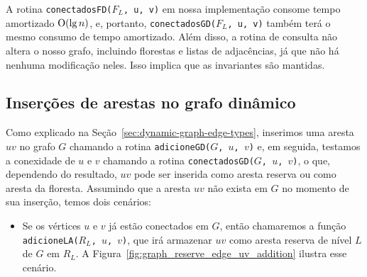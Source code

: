 \raggedbottom


A rotina \texttt{conectadosFD($F_L$, u, v)} em nossa implementação consome tempo amortizado $\mathrm{O}(\lg n)$, e, portanto, \texttt{conectadosGD($F_L$, u, v)} também terá o mesmo consumo de tempo amortizado.
Além disso, a rotina de consulta não altera o nosso grafo, incluindo florestas e listas de adjacências, já que não há nenhuma modificação neles. Isso implica que as invariantes são mantidas. 









\subsection{Inserções de arestas no grafo dinâmico}

Como explicado na Seção~\ref{sec:dynamic-graph-edge-types}, inserimos uma aresta $uv$ no grafo $G$ chamando a rotina \texttt{adicioneGD($G$, $u$, $v$)} e, em seguida, testamos a conexidade de $u$ e $v$ chamando a rotina \texttt{conectadosGD($G$, $u$, $v$)}, o que, dependendo do resultado, $uv$ pode ser inserida como aresta reserva ou como aresta da floresta. Assumindo que a aresta $uv$ não exista em $G$ no momento de sua inserção, temos dois cenários:

\begin{itemize}
    \item 
    Se os vértices $u$ e $v$ já estão conectados em $G$, então chamaremos a função \texttt{adicioneLA($R_L$, $u$, $v$)}, que irá armazenar $uv$ como aresta reserva de nível $L$ de $G$ em $R_L$. A Figura~\ref{fig:graph_reserve_edge_uv_addition} ilustra esse cenário.

\end{itemize}

